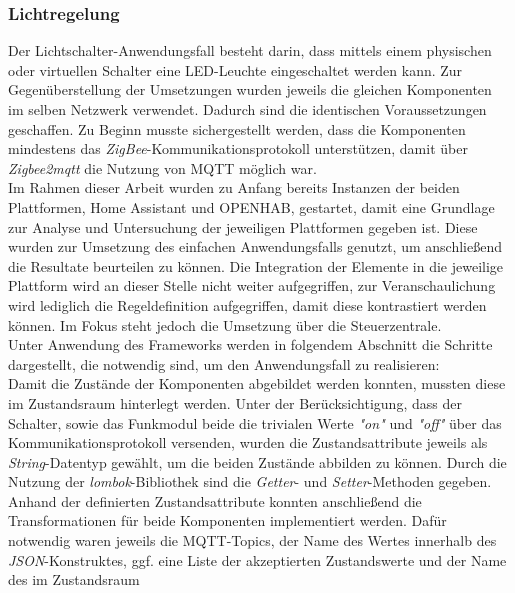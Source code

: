     \subsubsection*{Lichtregelung}
    Der Lichtschalter-Anwendungsfall besteht darin, dass mittels einem physischen oder virtuellen Schalter eine LED-Leuchte eingeschaltet werden kann. Zur 
    Gegenüberstellung der Umsetzungen wurden jeweils die gleichen Komponenten im selben Netzwerk verwendet. Dadurch sind die identischen Voraussetzungen geschaffen. 
    Zu Beginn musste sichergestellt werden, dass die Komponenten mindestens das \textit{ZigBee}-Kommunikationsprotokoll unterstützen, damit über \textit{Zigbee2mqtt} 
    die Nutzung von \acs{MQTT} möglich war. 
    \\
    Im Rahmen dieser Arbeit wurden zu Anfang bereits Instanzen der beiden Plattformen, Home Assistant und \acs{OPENHAB}, gestartet, damit eine Grundlage zur Analyse und 
    Untersuchung der jeweiligen Plattformen gegeben ist. Diese wurden zur Umsetzung des einfachen Anwendungsfalls genutzt, um anschließend die 
    Resultate beurteilen zu können. Die Integration der Elemente in die jeweilige Plattform wird an dieser Stelle nicht weiter aufgegriffen, zur Veranschaulichung wird 
    lediglich die Regeldefinition aufgegriffen, damit diese kontrastiert werden können. Im Fokus steht jedoch die Umsetzung über die Steuerzentrale.
    \\
    \linebreak
    Unter Anwendung des Frameworks werden in folgendem Abschnitt die Schritte dargestellt, die notwendig sind, um den Anwendungsfall zu realisieren:
    \\
    Damit die Zustände der Komponenten abgebildet werden konnten, mussten diese im Zustandsraum hinterlegt werden. Unter der Berücksichtigung, dass der Schalter, sowie das Funkmodul 
    beide die trivialen Werte \textit{"on"} und \textit{"off"} über das Kommunikationsprotokoll versenden, wurden die Zustandsattribute jeweils als \textit{String}-Datentyp gewählt, um die 
    beiden Zustände abbilden zu können. Durch die Nutzung der \textit{lombok}-Bibliothek sind die \textit{Getter}- und \textit{Setter}-Methoden gegeben. 
    \\
    Anhand der definierten Zustandsattribute konnten anschließend die Transformationen für beide Komponenten implementiert werden. Dafür notwendig waren jeweils 
    die \acs{MQTT}-Topics, der Name des Wertes innerhalb des \textit{JSON}-Konstruktes, ggf. eine Liste der akzeptierten Zustandswerte und der Name des im Zustandsraum 
